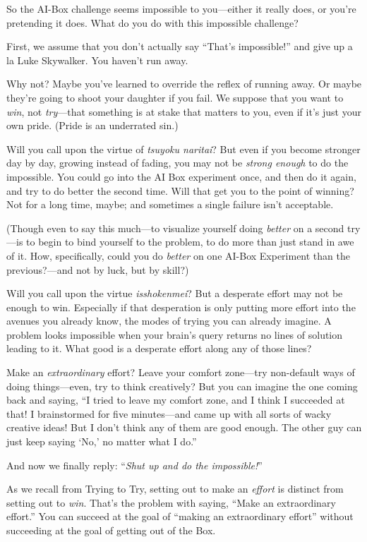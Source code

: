 {
 So the AI-Box challenge seems impossible to you---either it really
does, or you're pretending it does. What do you do with
this impossible challenge?}

{
 First, we assume that you don't actually say
``That's
impossible!'' and give up a la Luke Skywalker. You
haven't run away.}

{
 Why not? Maybe you've learned to override the
reflex of running away. Or maybe they're going to shoot
your daughter if you fail. We suppose that you want to \textit{win},
not \textit{try}{}---that something is at stake that matters to you,
even if it's just your own pride. (Pride is an
underrated sin.)}

{
 Will you call upon the virtue of \textit{tsuyoku naritai}? But
even if you become stronger day by day, growing instead of fading, you
may not be \textit{strong enough} to do the impossible. You could go
into the AI Box experiment once, and then do it again, and try to do
better the second time. Will that get you to the point of winning? Not
for a long time, maybe; and sometimes a single failure
isn't acceptable.}

{
 (Though even to say this much---to visualize yourself doing
\textit{better} on a second try---is to begin to bind yourself to the
problem, to do more than just stand in awe of it. How, specifically,
could you do \textit{better} on one AI-Box Experiment than the
previous?---and not by luck, but by skill?)}

{
 Will you call upon the virtue \textit{isshokenmei}? But a
desperate effort may not be enough to win. Especially if that
desperation is only putting more effort into the avenues you already
know, the modes of trying you can already imagine. A problem looks
impossible when your brain's query returns no lines of
solution leading to it. What good is a desperate effort along any of
those lines?}

{
 Make an \textit{extraordinary} effort? Leave your comfort
zone---try non-default ways of doing things---even, try to think
creatively? But you can imagine the one coming back and saying,
``I tried to leave my comfort zone, and I think I
succeeded at that! I brainstormed for five minutes---and came up with
all sorts of wacky creative ideas! But I don't think
any of them are good enough. The other guy can just keep saying
`No,' no matter what I
do.''}

{
 And now we finally reply: ``\textit{Shut up and
do the impossible!}''}

{
 As we recall from Trying to Try, setting out to make an
\textit{effort} is distinct from setting out to \textit{win}.
That's the problem with saying, ``Make
an extraordinary effort.'' You can succeed at the
goal of ``making an extraordinary
effort'' without succeeding at the goal of getting
out of the Box.}

